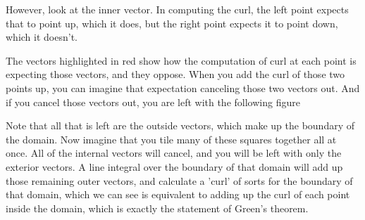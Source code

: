 \documentclass{article}
\begin{document}
    However, look at the inner vector.
    In computing the curl, the left point expects that to point up, which it does,
    but the right point expects it to point down, which it doesn't.
    \begin{figure}[!h]
        \centering
    \end{figure}
    The vectors highlighted in red show how the computation of curl at each point is expecting those vectors, and they oppose.
    When you add the curl of those two points up, you can imagine that expectation canceling those two vectors out.
    And if you cancel those vectors out, you are left with the following figure
    \begin{figure}[!h]
        \centering
    \end{figure}
    Note that all that is left are the outside vectors, which make up the boundary of the domain.
    Now imagine that you tile many of these squares together all at once.
    All of the internal vectors will cancel, and you will be left with only the exterior vectors.
    A line integral over the boundary of that domain will add up those remaining outer vectors, and calculate a 'curl' of sorts
    for the boundary of that domain, which we can see is equivalent to adding up the curl of each point inside the domain,
    which is exactly the statement of Green's theorem.
\end{document}
